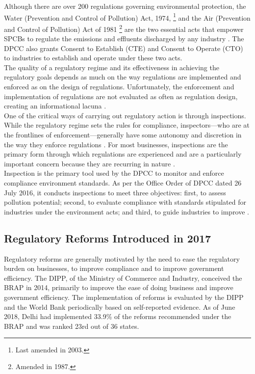 \documentclass[a4paper, 12pt, twoside]{article}
\begin{document}
                 Although there are over 200 regulations governing environmental protection, the Water (Prevention and Control of Pollution) Act, 1974, \footnote{Last amended in 2003.} and the Air (Prevention and Control of Pollution) Act of 1981 \footnote{Amended in 1987.} are the two essential acts that empower SPCBs to regulate the emissions and effluents discharged by any industry \parencite{OECD06}. The DPCC also grants Consent to Establish (CTE) and Consent to Operate (CTO) to industries to establish and operate under these two acts. \\
                 
                 The quality of a regulatory regime and its effectiveness in achieving the regulatory goals depends as much on the way regulations are implemented and enforced as on the design of regulations. Unfortunately, the enforcement and implementation of regulations are not evaluated as often as regulation design, creating an informational lacuna \parencite{OECD14}. \\
                 
                 One of the critical ways of carrying out regulatory action is through inspections. While the regulatory regime sets the rules for compliance, inspectors—who are at the frontlines of enforcement—generally have some autonomy and discretion in the way they enforce regulations \parencite{May2003}. For most businesses, inspections are the primary form through which regulations are experienced and are a particularly important concern because they are recurring in nature \parencite{blancflorentin}. \\
                 
                 Inspection is the primary tool used by the DPCC to monitor and enforce compliance environment standards. As per the Office Order of DPCC dated 26 July 2016, it conducts inspections to meet three objectives: first, to assess pollution potential; second, to evaluate compliance with standards stipulated for industries under the environment acts; and third, to guide industries to improve \parencite{DPCCb}. 
                 
                 \subsection{Regulatory Reforms Introduced in 2017}
                 
                 Regulatory reforms are generally motivated by the need to ease the regulatory burden on businesses, to improve compliance and to improve government efficiency. The DIPP, of the Ministry of Commerce and Industry, conceived the BRAP in 2014, primarily to improve the ease of doing business and improve government efficiency. The implementation of reforms is evaluated by the DIPP and the World Bank periodically based on self-reported evidence. As of June 2018, Delhi had implemented 33.9\% of the reforms recommended under the BRAP and was ranked 23rd out of 36 states. \\
                 
\end{document}
